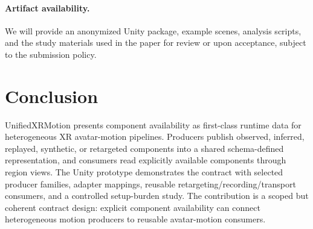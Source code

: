 \documentclass[runningheads]{llncs}
\begin{document}
\paragraph{Artifact availability.}
We will provide an anonymized Unity package, example scenes, analysis scripts, and the study materials used in the paper for review or upon acceptance, subject to the submission policy.

\section{Conclusion}\label{sec:conclusion}
UnifiedXRMotion presents component availability as first-class runtime data for heterogeneous XR avatar-motion pipelines. Producers publish observed, inferred, replayed, synthetic, or retargeted components into a shared schema-defined representation, and consumers read explicitly available components through region views. The Unity prototype demonstrates the contract with selected producer families, adapter mappings, reusable retargeting/recording/transport consumers, and a controlled setup-burden study. The contribution is a scoped but coherent contract design: explicit component availability can connect heterogeneous motion producers to reusable avatar-motion consumers.



\end{document}
